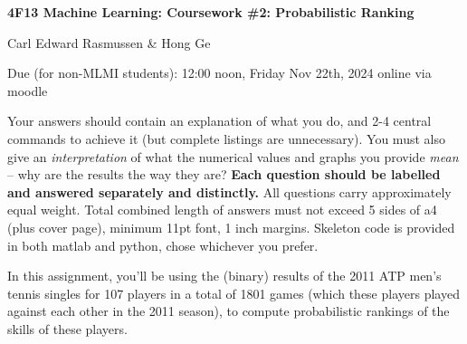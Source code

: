 \documentclass[11pt]{article}
\begin{document}
\centerline{\large\bf 4F13 Machine Learning: Coursework \#2:
  Probabilistic Ranking}

\vspace{0.3cm}

\centerline{Carl Edward Rasmussen \& Hong Ge} 

\vspace{0.2cm}

\centerline{Due (for non-MLMI students): 12:00 noon, Friday Nov 22th, 2024 online via moodle}

\vspace{2mm}

Your answers should contain an explanation of what you do, and 2-4
central commands to achieve it (but complete listings are
unnecessary). You must also give an \emph{interpretation} of what the
numerical values and graphs you provide \emph{mean} -- why are the
results the way they are? {\bf Each question should be labelled and
  answered separately and distinctly.} All questions carry
approximately equal weight. Total combined length of answers must not
exceed 5 sides of a4 (plus cover page), minimum 11pt font, 1 inch
margins. Skeleton code is provided in both matlab and python, chose
whichever you prefer.

In this assignment, you'll be using the (binary) results of the 2011
ATP men's tennis singles for 107 players in a total of 1801 games
(which these players played against each other in the 2011 season), to
compute probabilistic rankings of the skills of these players.
\end{document}
